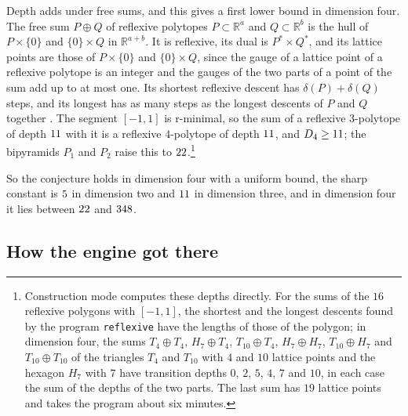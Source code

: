 Depth adds under free sums, and this gives a first lower bound in dimension four. The free sum $P\oplus Q$ of reflexive polytopes $P\subset\mathbb{R}^{a}$ and $Q\subset\mathbb{R}^{b}$ is the hull of $P\times\{0\}$ and $\{0\}\times Q$ in $\mathbb{R}^{a+b}$. It is reflexive, its dual is $P^{*}\times Q^{*}$, and its lattice points are those of $P\times\{0\}$ and $\{0\}\times Q$, since the gauge of a lattice point of a reflexive polytope is an integer and the gauges of the two parts of a point of the sum add up to at most one. Its shortest reflexive descent has $\delta(P)+\delta(Q)$ steps, and its longest has as many steps as the longest descents of $P$ and $Q$ together \cite{BhaSeed}. The segment $[-1,1]$ is r-minimal, so the sum of a reflexive $3$-polytope of depth $11$ with it is a reflexive $4$-polytope of depth $11$, and $D_{4}\ge11$; the bipyramids $P_{1}$ and $P_{2}$ raise this to $22$.\footnote{Construction mode computes these depths directly. For the sums of the $16$ reflexive polygons with $[-1,1]$, the shortest and the longest descents found by the program \texttt{reflexive} have the lengths of those of the polygon; in dimension four, the sums $T_{4}\oplus T_{4}$, $H_{7}\oplus T_{4}$, $T_{10}\oplus T_{4}$, $H_{7}\oplus H_{7}$, $T_{10}\oplus H_{7}$ and $T_{10}\oplus T_{10}$ of the triangles $T_{4}$ and $T_{10}$ with $4$ and $10$ lattice points and the hexagon $H_{7}$ with $7$ have transition depths $0$, $2$, $5$, $4$, $7$ and $10$, in each case the sum of the depths of the two parts. The last sum has $19$ lattice points and takes the program about six minutes.}

So the conjecture holds in dimension four with a uniform bound, the sharp constant is $5$ in dimension two and $11$ in dimension three, and in dimension four it lies between $22$ and $348$.

\subsection{How the engine got there}\label{ssec:seedrun}

